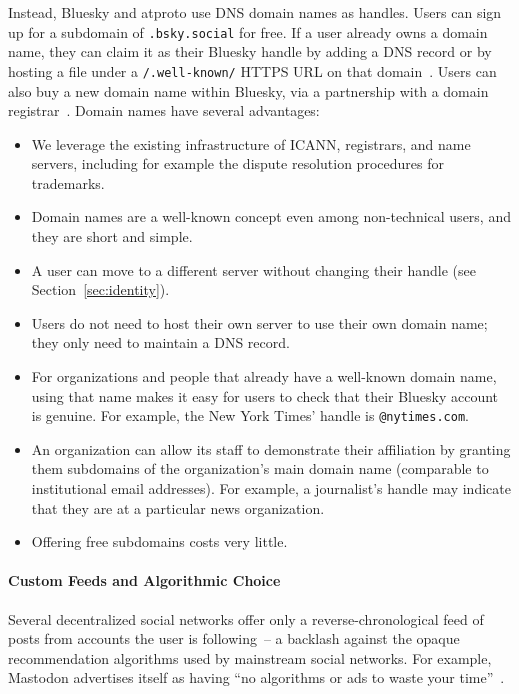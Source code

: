 \documentclass[sigconf]{acmart}
\newif\ifextendedversion
\begin{document}
Instead, Bluesky and atproto use DNS domain names as handles.
Users can sign up for a subdomain of \texttt{.bsky.social} for free.
If a user already owns a domain name, they can claim it as their Bluesky handle by adding a DNS record or by hosting a file under a \texttt{/.well-known/} HTTPS URL on that domain~\cite{DomainHandle}.
Users can also buy a new domain name within Bluesky, via a partnership with a domain registrar~\cite{PurchaseDomain}.
Domain names have several advantages:
\begin{itemize}
    \item We leverage the existing infrastructure of ICANN, registrars, and name servers, including for example the dispute resolution procedures for trademarks.
    \item Domain names are a well-known concept even among non-technical users, and they are short and simple.
    \item A user can move to a different server without changing their handle (see Section~\ref{sec:identity}).
    \item Users do not need to host their own server to use their own domain name; they only need to maintain a DNS record.
    \item For organizations and people that already have a well-known domain name, using that name makes it easy for users to check that their Bluesky account is genuine. For example, the New York Times' handle is \texttt{@nytimes.com}.
    \item An organization can allow its staff to demonstrate their affiliation by granting them subdomains of the organization's main domain name (comparable to institutional email addresses). For example, a journalist's handle may indicate that they are at a particular news organization.
    \item Offering free subdomains costs very little.
\end{itemize}

\ifextendedversion\subsection{Custom Feeds and Algorithmic Choice}\label{sec:feeds}\else\paragraph{Custom Feeds and Algorithmic Choice}\fi

Several decentralized social networks offer only a reverse-chrono\-logical feed of posts from accounts the user is following~-- a backlash against the opaque recommendation algorithms used by mainstream social networks.
For example, Mastodon advertises itself as having ``no algorithms or ads to waste your time''~\cite{Mastodon}.
\end{document}
